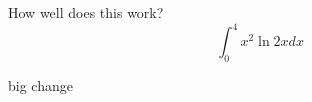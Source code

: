 \documentclass{article}
\begin{document}
How well does this work?
$$\int_0^4 x^2 \ln{2x}dx$$

big change
\end{document}
